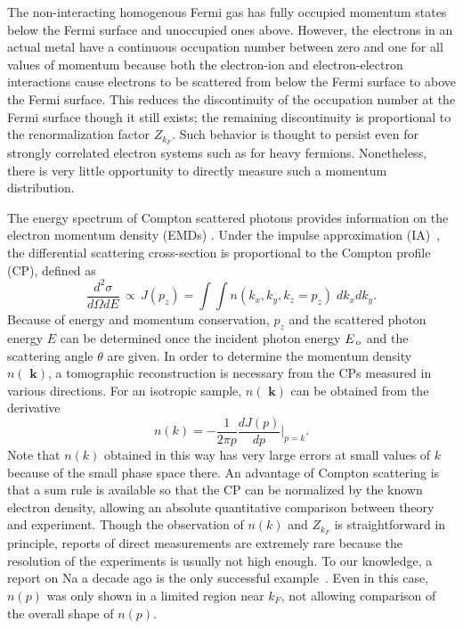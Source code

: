 \documentclass[twocolumn,showpacs,showkeys,fleqn,prl,superscriptaddress]{revtex4}%
\newcommand{\bb}[1]{\textbf{ #1}}
\newcommand{\nn}[1]{\textnormal{ #1}}
\begin{document}
The non-interacting homogenous Fermi gas has fully occupied momentum states below the  Fermi surface and unoccupied ones above.
However, the electrons in an actual metal have a continuous occupation number between zero and one for all values of momentum because both the electron-ion and electron-electron interactions cause electrons to be scattered from below the Fermi surface to above the Fermi surface. This reduces the discontinuity of the occupation number at the Fermi surface though it still exists; the remaining discontinuity is proportional to the renormalization factor $Z_{k_F}$.
Such behavior
is thought to persist even for strongly correlated electron systems such as for heavy fermions.
Nonetheless, there is very little opportunity to   directly measure such a momentum distribution.

The energy spectrum of Compton scattered photons provides information on the  electron momentum density (EMDs) \cite{sch}.
Under the impulse approximation (IA)~\cite{eisen70,kaplan03}, the differential scattering cross-section is proportional to the Compton profile (CP), defined as
\begin{equation}
\frac{d^2\sigma}{d\Omega dE} \,\propto \, J(p_z) = \int \!\! \int n(k_x,k_y,k_z\!=\!p_z) \;dk_x dk_y .
\end{equation}
Because of energy and momentum conservation, $p_z$ and the scattered photon energy $E$ can be determined once the incident photon energy $E_{\nn{\!o}}$ and the scattering angle $\theta$ are given.
In order to determine the momentum density $n(\!\!\bb{k})$, a tomographic reconstruction is necessary from the CPs measured in various directions.
For an isotropic sample, $n(\!\!\bb{k})$ can be obtained from the derivative
\begin{equation}
n(k) = - \frac{1}{2 \pi p} \frac{d J(p)}{d p}  | _{p=k}   .
\end{equation}
Note that $n(k)$ obtained in this way has very large errors at small values of $k$ because of the small phase space there.
An advantage of Compton scattering is that a sum rule is available so that the CP can be normalized by the known electron density, allowing an absolute quantitative comparison between theory and experiment.
Though the observation of $n(k)$ and $Z_{k_F}$ is straightforward in principle, reports of direct measurements are extremely rare because the resolution of the experiments is usually not high enough.
To our knowledge, a report on Na a decade ago is the only successful example~\cite{simo10}.
Even in this case, $n(p)$ was only shown in a limited region near $k_F$, not allowing comparison of the overall shape of $n(p)$.
\end{document}
